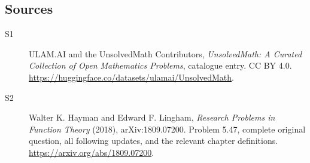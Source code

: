 \documentclass[11pt]{book}
\begin{document}
\subsection{Sources}
\begin{description}
\item[\hypertarget{source:statement:1}{S1}] ULAM.AI and the UnsolvedMath Contributors, \emph{UnsolvedMath: A Curated Collection of Open Mathematics Problems}, catalogue entry. CC BY 4.0. \url{https://huggingface.co/datasets/ulamai/UnsolvedMath}.
\item[\hypertarget{source:statement:2}{S2}] Walter K. Hayman and Edward F. Lingham, \emph{Research Problems in Function Theory} (2018), arXiv:1809.07200. Problem 5.47, complete original question, all following updates, and the relevant chapter definitions. \url{https://arxiv.org/abs/1809.07200}.
\end{description}
\label{end:statement}
\end{document}
